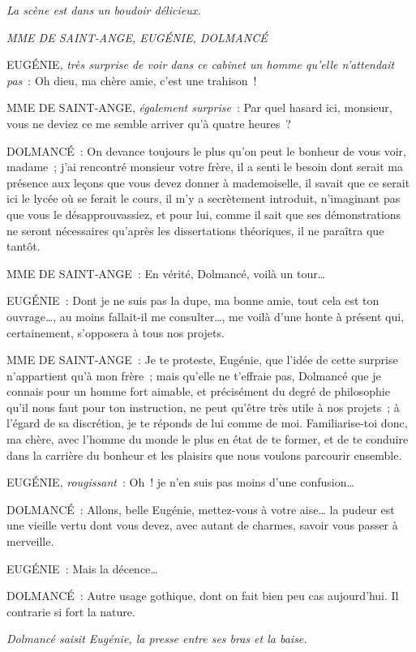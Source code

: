\documentclass[french,twoside]{book} %
\begin{document}
\textit{La scène est dans un boudoir délicieux.}\par
\textit{MME DE SAINT-ANGE, EUGÉNIE, DOLMANCÉ}\par
\noindent EUGÉNIE, {\itshape très surprise de voir dans ce cabinet un homme qu’elle n’attendait pas} : Oh dieu, ma chère amie, c’est une trahison !\par
MME DE SAINT-ANGE, {\itshape également surprise} : Par quel hasard ici, monsieur, vous ne deviez ce me semble arriver qu’à quatre heures ?\par
DOLMANCÉ : On devance toujours le plus qu’on peut le bonheur de vous voir, madame ; j’ai rencontré monsieur votre frère, il a senti le besoin dont serait ma présence aux leçons que vous devez donner à mademoiselle, il savait que ce serait ici le lycée où se ferait le cours, il m’y a secrètement introduit, n’imaginant pas que vous le désapprouvassiez, et pour lui, comme il sait que ses démonstrations ne seront nécessaires qu’après les dissertations théoriques, il ne paraîtra que tantôt.\par
MME DE SAINT-ANGE : En vérité, Dolmancé, voilà un tour…\par
EUGÉNIE : Dont je ne suis pas la dupe, ma bonne amie, tout cela est ton ouvrage…, au moins fallait-il me consulter…, me voilà d’une honte à présent qui, certainement, s’opposera à tous nos projets.\par
MME DE SAINT-ANGE : Je te proteste, Eugénie, que l’idée de cette surprise n’appartient qu’à mon frère ; mais qu’elle ne t’effraie pas, Dolmancé que je connais pour un homme fort aimable, et précisément du degré de philosophie qu’il nous faut pour ton instruction, ne peut qu’être très utile à nos projets ; à l’égard de sa discrétion, je te réponds de lui comme de moi. Familiarise-toi donc, ma chère, avec l’homme du monde le plus en état de te former, et de te conduire dans la carrière du bonheur et les plaisirs que nous voulons parcourir ensemble.\par
EUGÉNIE, {\itshape rougissant} : Oh ! je n’en suis pas moins d’une confusion…\par
DOLMANCÉ : Allons, belle Eugénie, mettez-vous à votre aise… la pudeur est une vieille vertu dont vous devez, avec autant de charmes, savoir vous passer à merveille.\par
EUGÉNIE : Mais la décence…\par
DOLMANCÉ : Autre usage gothique, dont on fait bien peu cas aujourd’hui. Il contrarie si fort la nature.\par
{\itshape Dolmancé saisit Eugénie, la presse entre ses bras et la baise.}\par
\end{document}
